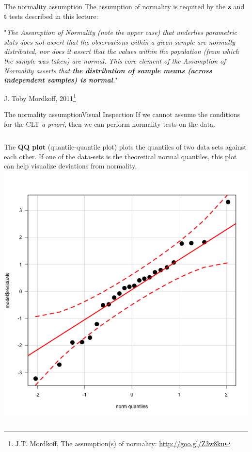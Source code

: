 \begin{frame}{The normality assumption}
  The assumption of normality is required by the {\bf z} and {\bf t} tests described in this lecture:\medskip

  \begin{block}{}
    "\emph{The Assumption of Normality (note the upper case) that underlies parametric stats does not assert that the observations within a given sample are normally distributed, nor does it assert that the values within the population (from which the sample was taken) are normal. This core element of the Assumption of Normality asserts that {\bf the distribution of sample means (across independent samples) is normal}.}"\bigskip

    \hfill J. Toby Mordkoff, 2011\footnote{J.T. Mordkoff, The assumption(s) of normality: \url{http://goo.gl/Z3w8ku}}
  \end{block}
\end{frame}

\begin{frame}{The normality assumption}{Visual Inspection}
  If we cannot assume the conditions for the CLT \emph{a priori},
  then we can perform normality tests on the data.

  \begin{columns}
      The {\bf QQ plot} (quantile-quantile plot) plots the quantiles of two data sets against each other. If one of the data-sets is the theoretical normal quantiles, this plot can help visualize deviations from normality.\bigskip
      \includegraphics[width=\textwidth]{../img/qq_plot}
  \end{columns}
\end{frame}

